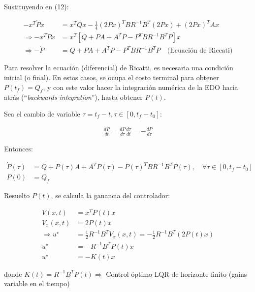 Sustituyendo en (12):

\begin{align*}
    -x^T \dot{P}x &= x^T Q x-\frac{1}{4} \left( 2 P x \right)^T B R^{-1} B^T \left( 2 P x \right) + \left( 2 P x \right)^T Ax\\
    \Longrightarrow -x^T \dot{P} x &= x^T \left[Q + PA + A^T P - P^T B R^{-1} B^T P \right]x\\
    \Longrightarrow -\dot{P} &= Q + P A +A^T P -P^T BR^{-1}B^T P \quad \text{(Ecuación de Riccati)}
\end{align*}

Para resolver la ecuación (diferencial) de Ricatti, es necesaria una condición inicial (o final). En estos casos, se ocupa el costo terminal para obtener $P(t_f) = Q_f$, y con este valor hacer la integración numérica de la EDO hacia atrás (``\emph{backwards integration}''), hasta obtener $P(t)$.

Sea el cambio de variable $\tau = t_f - t, \tau \in [0, t_f-t_0]$:

\begin{align}
    \frac{dP}{dt} = \frac{dP}{d\tau} \frac{d\tau}{dt} = -\frac{dP}{d\tau}
\end{align}

Entonces:

\begin{align*}
   \dot{P}(\tau) &= Q + P(\tau) A +A^T P(\tau) - P(\tau)^T B R^{-1} B^T P(\tau), \quad \forall \tau \in [0,t_f - t_0] \\
   P(0) &= Q_f
\end{align*}

Resuelto $P(t)$, se calcula la ganancia del controlador:

\begin{align*}
    V(x,t) &= x^T P(t)x \\
    V_x(x,t) &= 2 P(t) x\\
    \Longrightarrow u^\star &= \frac{1}{2} R^{-1} B^T V_x(x,t) = -\frac{1}{2} R^{-1} B^T \left( 2 P(t) x \right)\\
    u^\star &= - R^{-1} B^T P(t) x\\
    u^\star &= -K(t) x
\end{align*}

donde $K(t) = R^{-1} B^T P(t) \Longrightarrow$ Control óptimo LQR de horizonte finito (gains variable en el tiempo)


